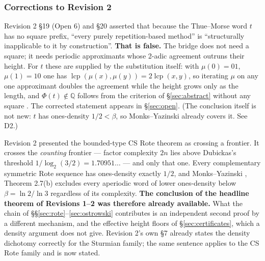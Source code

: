\documentclass[11pt]{article}
\newcommand{\Q}{\mathbb{Q}}
\begin{document}
\subsubsection*{Corrections to Revision 2}

\begin{description}[leftmargin=2.5em,style=nextline]

\item[D1 --- The Thue--Morse scope claim is withdrawn.] Revision 2 \S19 (Open 6) and \S20 asserted
that because the Thue--Morse word $t$ has no square prefix, ``every purely repetition-based
method'' is ``structurally inapplicable to it by construction''. \textbf{That is false.} The bridge
does not need a square; it needs periodic approximants whose 2-adic agreement outruns their height.
For $t$ these are supplied by the substitution itself: with $\mu(0)=01$, $\mu(1)=10$ one has
$\operatorname{lcp}(\mu(x),\mu(y))=2\operatorname{lcp}(x,y)$, so iterating $\mu$ on any one
approximant doubles the agreement while the height grows only as the length, and
$\Phi(t)\notin\Q$ follows from the criterion of \S\ref{sec:abstract} without any square
\cite{Phase9bTM}. The corrected statement appears in \S\ref{sec:open}. (The conclusion itself is not
new: $t$ has ones-density $1/2<\beta$, so Monks--Yazinski \cite{MonksYazinski2004} already
covers it. See D2.)

\item[D2 --- The novelty framing of the CS Rote theorem is corrected.] Revision 2 presented the
bounded-type CS Rote theorem as crossing a frontier. It crosses the \emph{counting} frontier ---
factor complexity $2n$ lies above Dubickas's threshold $1/\log_2(3/2)=1.70951\ldots$ --- and only
that one. Every complementary symmetric Rote sequence has ones-density exactly $1/2$, and
Monks--Yazinski \cite{MonksYazinski2004}, Theorem 2.7(b) excludes every aperiodic word of lower
ones-density below $\beta=\ln2/\ln3$ regardless of its complexity. \textbf{The conclusion of the
headline theorem of Revisions 1--2 was therefore already available.} What the chain of
\S\S\ref{sec:rote}--\ref{sec:ostrowski} contributes is an independent second proof by a different
mechanism, and the effective height floors of \S\ref{sec:certificates}, which a density argument
does not give. Revision 2's own \S7 already states the density dichotomy correctly for the Sturmian
family; the same sentence applies to the CS Rote family and is now stated.


\end{description}
\end{document}

